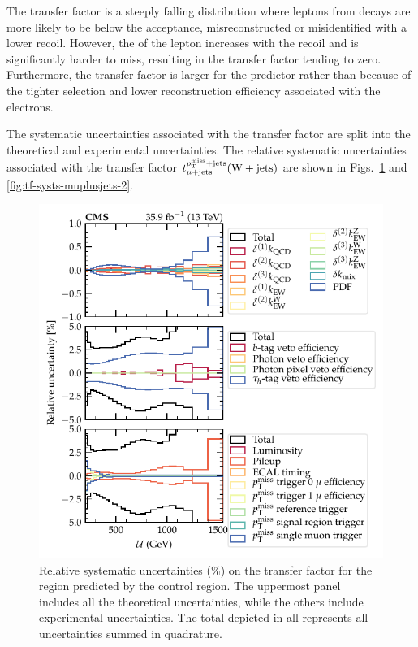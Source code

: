 The transfer factor is a steeply falling distribution where leptons from \PW decays are more likely to be below the \pt acceptance, misreconstructed or
misidentified with a lower recoil. However, the \pt of the lepton increases
with the recoil and is significantly harder to miss, resulting in the transfer
factor tending to zero. Furthermore, the transfer factor is larger for the
\eleplusjets predictor rather than \muplusjets because of the tighter
selection and lower reconstruction efficiency associated with the electrons.

The systematic uncertainties associated with the \muplusjets transfer factor
are split into the theoretical and experimental uncertainties. The relative
systematic uncertainties associated with the transfer factor
$t_{\mu+\mathrm{jets}}^{p_{\text{T}}^{\mathrm{miss}}+\mathrm{jets}}({\mathrm{W}+\mathrm{jets}})$ are shown in
Figs.~\ref{fig:tf-systs-muplusjets-1} and \ref{fig:tf-systs-muplusjets-2}.
%
\begin{figure}
    \centering
    \includegraphics{chapters/042_backgrounds/images/tf_wj_mu_met_systs1.pdf}
    \caption[Theoretical uncertainty on the transfer factors]{
        Relative systematic uncertainties (\%) on the \IWj transfer factor for the \metplusjets region predicted by the \muplusjets control region. The uppermost panel includes all the theoretical uncertainties, while the others include experimental uncertainties. The total depicted in all represents all uncertainties summed in quadrature.
    }
    \label{fig:tf-systs-muplusjets-1}
\end{figure}
